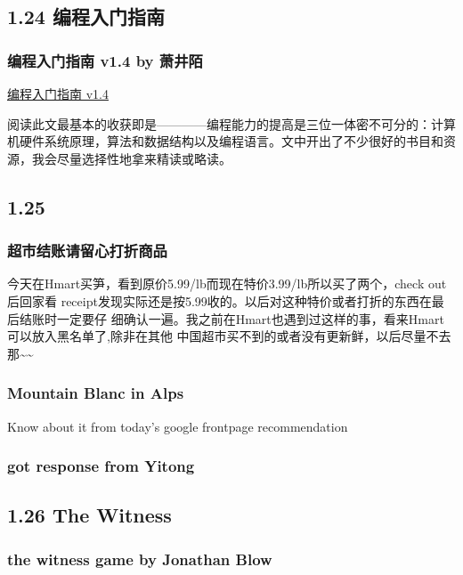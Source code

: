 \documentclass[11pt]{article}
\begin{document}
\subsection*{1.24 编程入门指南}
\label{sec:orgheadline51}

\subsubsection*{编程入门指南 v1.4 by 萧井陌}
\label{sec:orgheadline50}
\href{http://zhuanlan.zhihu.com/xiao-jing-mo/19959253}{编程入门指南 v1.4}

阅读此文最基本的收获即是————编程能力的提高是三位一体密不可分的：计算机硬件系统原理，算法和数据结构以及编程语言。文中开出了不少很好的书目和资源，我会尽量选择性地拿来精读或略读。

\subsection*{1.25}
\label{sec:orgheadline55}

\subsubsection*{超市结账请留心打折商品}
\label{sec:orgheadline52}
今天在Hmart买笋，看到原价5.99/lb而现在特价3.99/lb所以买了两个，check out后回家看
receipt发现实际还是按5.99收的。以后对这种特价或者打折的东西在最后结账时一定要仔
细确认一遍。我之前在Hmart也遇到过这样的事，看来Hmart可以放入黑名单了,除非在其他
中国超市买不到的或者没有更新鲜，以后尽量不去那\textasciitilde{}\textasciitilde{}

\subsubsection*{Mountain Blanc in Alps}
\label{sec:orgheadline53}
Know about it from today's google frontpage recommendation

\subsubsection*{got response from Yitong}
\label{sec:orgheadline54}
\subsection*{1.26 The Witness}
\label{sec:orgheadline65}

\subsubsection*{\textbf{the witness} game by Jonathan Blow}
\label{sec:orgheadline59}
\end{document}
